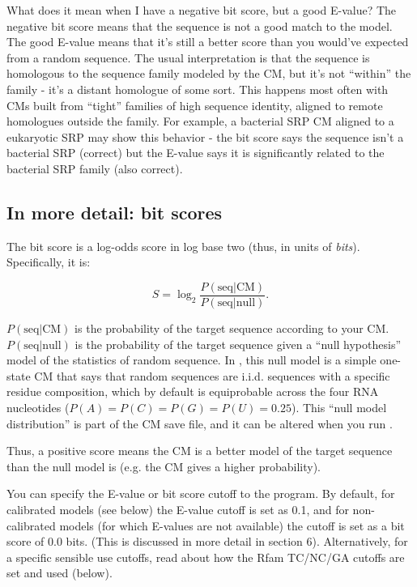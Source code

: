 \begin{srefaq}{What does it mean when I have a negative bit score,
but a good E-value?} The negative bit score means that the sequence is
not a good match to the model. The good E-value means that it's still
a better score than you would've expected from a random sequence. The
usual interpretation is that the sequence is homologous to the
sequence family modeled by the CM, but it's not ``within'' the family
- it's a distant homologue of some sort. This happens most often with
CMs built from ``tight'' families of high sequence identity, aligned
to remote homologues outside the family. For example, a bacterial SRP
CM aligned to a eukaryotic SRP may show this behavior - the bit
score says the sequence isn't a bacterial SRP (correct) but the E-value says
it is significantly related to the bacterial SRP family (also correct).
\end{srefaq}

\subsection{In more detail:  bit scores}

The bit score is a log-odds score in log base two (thus, in units of
{\em bits}). Specifically, it is:

\[
	S = \log_2 \frac {P( \mbox{seq} | \mbox{CM})} { P (\mbox{seq} |
	\mbox{null})}.
\]

$P( \mbox{seq} | \mbox{CM})$ is the probability of the target
sequence according to your CM. $ P (\mbox{seq} | \mbox{null}) $ is
the probability of the target sequence given a ``null hypothesis''
model of the statistics of random sequence. In , this null model
is a simple one-state CM that says that random sequences are i.i.d.
sequences with a specific residue composition, which by default is
equiprobable across the four RNA nucleotides ($P(A) = P(C) = P(G) =
P(U) = 0.25$). This ``null model distribution'' is part of the CM save
file, and it can be altered when you run .

Thus, a positive score means the CM is a better model of the target
sequence than the null model is (e.g. the CM gives a higher
probability).

You can specify the E-value or bit score cutoff to the 
program. By default, for calibrated models (see below) the E-value
cutoff is set as 0.1, and for non-calibrated models (for which
E-values are not available) the cutoff is set as a bit score of 0.0
bits. (This is discussed in more detail in section 6). Alternatively,
for a specific sensible use cutoffs, read about how the Rfam
TC/NC/GA cutoffs are set and used (below).

